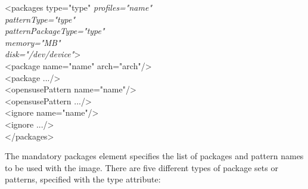 \begin{Command}{12cm}
<packages type="type" \textit{profiles="name"}\\
\hspace*{2.5cm}\textit{patternType="type"}\\
\hspace*{2.5cm}\textit{patternPackageType="type"}\\
\hspace*{2.5cm}\textit{memory="MB"}\\
\hspace*{2.5cm}\textit{disk="/dev/device"}>\\
\hspace*{1cm}<package name="name" arch="arch"/>\\
\hspace*{1cm}<package .../>\\
\hspace*{1cm}<opensusePattern name="name"/>\\
\hspace*{1cm}<opensusePattern .../>\\
\hspace*{1cm}<ignore name="name"/>\\
\hspace*{1cm}<ignore .../>\\
</packages>
\end{Command}

The mandatory packages element specifies the list of packages and
pattern names to be used with the image. There are five different
types of package sets or patterns, specified with the type attribute:

